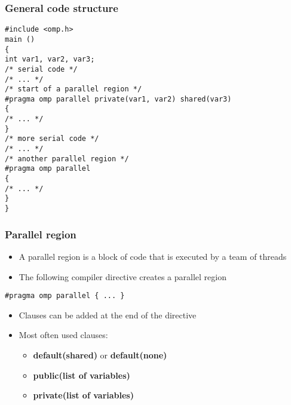 \documentclass{beamer}
\begin{document}
\begin{frame}
\frametitle{General code structure}

\begin{block}{}




















\begin{verbatim}
#include <omp.h>
main ()
{
int var1, var2, var3;
/* serial code */
/* ... */
/* start of a parallel region */
#pragma omp parallel private(var1, var2) shared(var3)
{
/* ... */
}
/* more serial code */
/* ... */
/* another parallel region */
#pragma omp parallel
{
/* ... */
}
}

\end{verbatim}

\end{block}
\end{frame}

\begin{frame}
\frametitle{Parallel region}

\begin{block}{}
\begin{itemize}
\item A parallel region is a block of code that is executed by a team of threads

\item The following compiler directive creates a parallel region
\end{itemize}

\noindent


\begin{verbatim}
#pragma omp parallel { ... }

\end{verbatim}

\begin{itemize}
\item Clauses can be added at the end of the directive

\item Most often used clauses:
\begin{itemize}

 \item \textbf{default(shared)} or \textbf{default(none)}

 \item \textbf{public(list of variables)}

 \item \textbf{private(list of variables)}
\end{itemize}

\noindent
\end{itemize}

\noindent
\end{block}
\end{frame}
\end{document}
